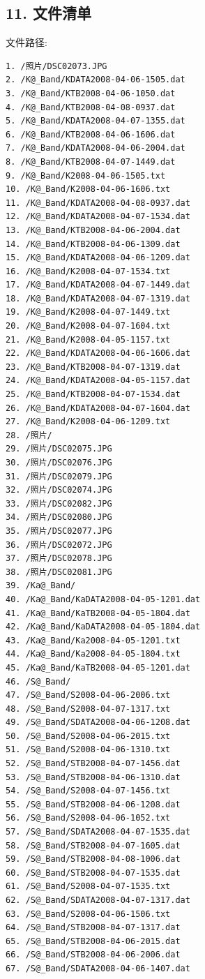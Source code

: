 \documentclass[letterpaper,10pt,english]{sphinxmanual}
\begin{document}
\subsection{11. 文件清单}
\label{fecd46b0-3390-4580-a415-2d49ba77f9bd:id11}
文件路径: 

\begin{Verbatim}[commandchars=@\[\]]
1. /照片/DSC02073.JPG
2. /K@_Band/KDATA2008-04-06-1505.dat
3. /K@_Band/KTB2008-04-06-1050.dat
4. /K@_Band/KTB2008-04-08-0937.dat
5. /K@_Band/KDATA2008-04-07-1355.dat
6. /K@_Band/KTB2008-04-06-1606.dat
7. /K@_Band/KDATA2008-04-06-2004.dat
8. /K@_Band/KTB2008-04-07-1449.dat
9. /K@_Band/K2008-04-06-1505.txt
10. /K@_Band/K2008-04-06-1606.txt
11. /K@_Band/KDATA2008-04-08-0937.dat
12. /K@_Band/KDATA2008-04-07-1534.dat
13. /K@_Band/KTB2008-04-06-2004.dat
14. /K@_Band/KTB2008-04-06-1309.dat
15. /K@_Band/KDATA2008-04-06-1209.dat
16. /K@_Band/K2008-04-07-1534.txt
17. /K@_Band/KDATA2008-04-07-1449.dat
18. /K@_Band/KDATA2008-04-07-1319.dat
19. /K@_Band/K2008-04-07-1449.txt
20. /K@_Band/K2008-04-07-1604.txt
21. /K@_Band/K2008-04-05-1157.txt
22. /K@_Band/KDATA2008-04-06-1606.dat
23. /K@_Band/KTB2008-04-07-1319.dat
24. /K@_Band/KDATA2008-04-05-1157.dat
25. /K@_Band/KTB2008-04-07-1534.dat
26. /K@_Band/KDATA2008-04-07-1604.dat
27. /K@_Band/K2008-04-06-1209.txt
28. /照片/
29. /照片/DSC02075.JPG
30. /照片/DSC02076.JPG
31. /照片/DSC02079.JPG
32. /照片/DSC02074.JPG
33. /照片/DSC02082.JPG
34. /照片/DSC02080.JPG
35. /照片/DSC02077.JPG
36. /照片/DSC02072.JPG
37. /照片/DSC02078.JPG
38. /照片/DSC02081.JPG
39. /Ka@_Band/
40. /Ka@_Band/KaDATA2008-04-05-1201.dat
41. /Ka@_Band/KaTB2008-04-05-1804.dat
42. /Ka@_Band/KaDATA2008-04-05-1804.dat
43. /Ka@_Band/Ka2008-04-05-1201.txt
44. /Ka@_Band/Ka2008-04-05-1804.txt
45. /Ka@_Band/KaTB2008-04-05-1201.dat
46. /S@_Band/
47. /S@_Band/S2008-04-06-2006.txt
48. /S@_Band/S2008-04-07-1317.txt
49. /S@_Band/SDATA2008-04-06-1208.dat
50. /S@_Band/S2008-04-06-2015.txt
51. /S@_Band/S2008-04-06-1310.txt
52. /S@_Band/STB2008-04-07-1456.dat
53. /S@_Band/STB2008-04-06-1310.dat
54. /S@_Band/S2008-04-07-1456.txt
55. /S@_Band/STB2008-04-06-1208.dat
56. /S@_Band/S2008-04-06-1052.txt
57. /S@_Band/SDATA2008-04-07-1535.dat
58. /S@_Band/STB2008-04-07-1605.dat
59. /S@_Band/STB2008-04-08-1006.dat
60. /S@_Band/STB2008-04-07-1535.dat
61. /S@_Band/S2008-04-07-1535.txt
62. /S@_Band/SDATA2008-04-07-1317.dat
63. /S@_Band/S2008-04-06-1506.txt
64. /S@_Band/STB2008-04-07-1317.dat
65. /S@_Band/STB2008-04-06-2015.dat
66. /S@_Band/STB2008-04-06-2006.dat
67. /S@_Band/SDATA2008-04-06-1407.dat

\end{Verbatim}
\end{document}
